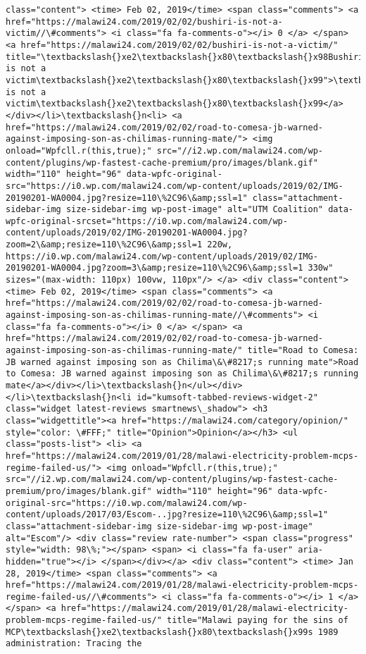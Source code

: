 \documentclass[11pt]{article}
\begin{document}
\begin{Verbatim}[commandchars=\\\{\}]
class="content"> <time> Feb 02, 2019</time> <span class="comments"> <a href="https://malawi24.com/2019/02/02/bushiri-is-not-a-victim//\#comments"> <i class="fa fa-comments-o"></i> 0 </a> </span> <a href="https://malawi24.com/2019/02/02/bushiri-is-not-a-victim/" title="\textbackslash{}xe2\textbackslash{}x80\textbackslash{}x98Bushiri is not a victim\textbackslash{}xe2\textbackslash{}x80\textbackslash{}x99">\textbackslash{}xe2\textbackslash{}x80\textbackslash{}x98Bushiri is not a victim\textbackslash{}xe2\textbackslash{}x80\textbackslash{}x99</a></div></li>\textbackslash{}n<li> <a href="https://malawi24.com/2019/02/02/road-to-comesa-jb-warned-against-imposing-son-as-chilimas-running-mate/"> <img onload="Wpfcll.r(this,true);" src="//i2.wp.com/malawi24.com/wp-content/plugins/wp-fastest-cache-premium/pro/images/blank.gif" width="110" height="96" data-wpfc-original-src="https://i0.wp.com/malawi24.com/wp-content/uploads/2019/02/IMG-20190201-WA0004.jpg?resize=110\%2C96\&amp;ssl=1" class="attachment-sidebar-img size-sidebar-img wp-post-image" alt="UTM Coalition" data-wpfc-original-srcset="https://i0.wp.com/malawi24.com/wp-content/uploads/2019/02/IMG-20190201-WA0004.jpg?zoom=2\&amp;resize=110\%2C96\&amp;ssl=1 220w, https://i0.wp.com/malawi24.com/wp-content/uploads/2019/02/IMG-20190201-WA0004.jpg?zoom=3\&amp;resize=110\%2C96\&amp;ssl=1 330w" sizes="(max-width: 110px) 100vw, 110px"/> </a> <div class="content"> <time> Feb 02, 2019</time> <span class="comments"> <a href="https://malawi24.com/2019/02/02/road-to-comesa-jb-warned-against-imposing-son-as-chilimas-running-mate//\#comments"> <i class="fa fa-comments-o"></i> 0 </a> </span> <a href="https://malawi24.com/2019/02/02/road-to-comesa-jb-warned-against-imposing-son-as-chilimas-running-mate/" title="Road to Comesa: JB warned against imposing son as Chilima\&\#8217;s running mate">Road to Comesa: JB warned against imposing son as Chilima\&\#8217;s running mate</a></div></li>\textbackslash{}n</ul></div></li>\textbackslash{}n<li id="kumsoft-tabbed-reviews-widget-2" class="widget latest-reviews smartnews\_shadow"> <h3 class="widgettitle"><a href="https://malawi24.com/category/opinion/" style="color: \#FFF;" title="Opinion">Opinion</a></h3> <ul class="posts-list"> <li> <a href="https://malawi24.com/2019/01/28/malawi-electricity-problem-mcps-regime-failed-us/"> <img onload="Wpfcll.r(this,true);" src="//i2.wp.com/malawi24.com/wp-content/plugins/wp-fastest-cache-premium/pro/images/blank.gif" width="110" height="96" data-wpfc-original-src="https://i0.wp.com/malawi24.com/wp-content/uploads/2017/03/Escom-..jpg?resize=110\%2C96\&amp;ssl=1" class="attachment-sidebar-img size-sidebar-img wp-post-image" alt="Escom"/> <div class="review rate-number"> <span class="progress" style="width: 98\%;"></span> <span> <i class="fa fa-user" aria-hidden="true"></i> </span></div></a> <div class="content"> <time> Jan 28, 2019</time> <span class="comments"> <a href="https://malawi24.com/2019/01/28/malawi-electricity-problem-mcps-regime-failed-us//\#comments"> <i class="fa fa-comments-o"></i> 1 </a> </span> <a href="https://malawi24.com/2019/01/28/malawi-electricity-problem-mcps-regime-failed-us/" title="Malawi paying for the sins of MCP\textbackslash{}xe2\textbackslash{}x80\textbackslash{}x99s 1989 administration: Tracing the 
\end{Verbatim}
\end{document}
